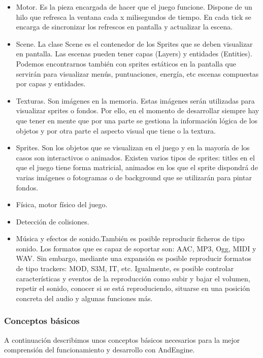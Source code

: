 \documentclass[12 pt, a4paper, twoside]{article}
\begin{document}
\begin{itemize}
\item Motor. Es la pieza encargada de hacer que el juego
  funcione. Dispone de un hilo que refresca la ventana cada x
  milisegundos de tiempo. En cada tick se encarga de sincronizar los
  refrescos en pantalla y actualizar la escena.

\item Scene. La clase Scene es el contenedor de los Sprites que se
  deben visualizar en pantalla. Las escenas pueden tener capas
  (Layers) y entidades (Entities). Podemos encontrarnos también con
  sprites estáticos en la pantalla que servirán para visualizar menús,
  puntuaciones, energía, etc escenas compuestas por capas y entidades.

\item Texturas. Son imágenes en la memoria. Estas
  imágenes serán utilizadas para visualizar sprites o fondos. Por
  ello, en el momento de desarrollar siempre hay que tener en mente
  que por una parte se gestiona la información lógica de los objetos y
  por otra parte el aspecto visual que tiene o la textura.

\item Sprites. Son los objetos que se visualizan en el
  juego y en la mayoría de los casos son interactivos o
  animados. Existen varios tipos de sprites: titles en el que el juego
  tiene forma matricial, animados en los que el sprite dispondrá de
  varias imágenes o fotogramas o de background que se utilizarán para
  pintar fondos.

\item Física, motor físico del juego.
\item Detección de colisiones.
\item Música y efectos de sonido.También es posible reproducir
  ficheros de tipo sonido. Los formatos que es capaz de soportar son:
  AAC, MP3, Ogg, MIDI y WAV. Sin embargo, mediante una expansión es
  posible reproducir formatos de tipo trackers: MOD, S3M, IT, etc.
  Igualmente, es posible controlar características y eventos de la
  reproducción como subir y bajar el volumen, repetir el sonido,
  conocer si se está reproduciendo, situarse en una posición concreta
  del audio y algunas funciones más.

\end{itemize}

\subsubsection{Conceptos básicos}
A continuación describimos unos conceptos básicos necesarios para la
mejor comprensión del funcionamiento y desarrollo con AndEngine.
\end{document}
